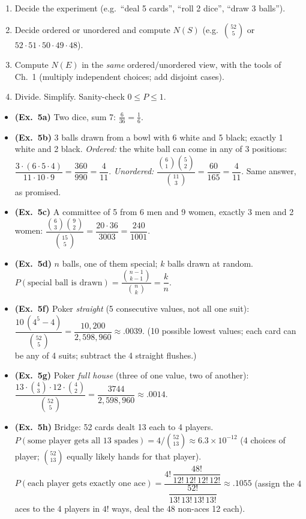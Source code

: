 \documentclass[11pt]{article}
\begin{document}
\begin{methodbox}
\begin{enumerate}
\item Decide the experiment (e.g.\ ``deal 5 cards'', ``roll 2 dice'', ``draw 3 balls'').
\item Decide ordered or unordered and compute $N(S)$ (e.g.\ $\binom{52}5$ or $52\cdot51\cdot50\cdot49\cdot48$).
\item Compute $N(E)$ in the \emph{same} ordered/unordered view, with the tools of Ch.~1 (multiply independent choices; add disjoint cases).
\item Divide. Simplify. Sanity-check $0\le P\le1$.
\end{enumerate}
\end{methodbox}

\begin{exbox}
\begin{itemize}
\item \textbf{(Ex.\ 5a)} Two dice, sum 7: $\tfrac6{36}=\tfrac16$.
\item \textbf{(Ex.\ 5b)} 3 balls drawn from a bowl with 6 white and 5 black; exactly 1 white and 2 black. \emph{Ordered:} the white ball can come in any of 3 positions: $\dfrac{3\cdot(6\cdot5\cdot4)}{11\cdot10\cdot9}=\dfrac{360}{990}=\dfrac4{11}$. \emph{Unordered:} $\dfrac{\binom61\binom52}{\binom{11}3}=\dfrac{60}{165}=\dfrac4{11}$. Same answer, as promised.
\item \textbf{(Ex.\ 5c)} A committee of 5 from 6 men and 9 women, exactly 3 men and 2 women: $\dfrac{\binom63\binom92}{\binom{15}5}=\dfrac{20\cdot36}{3003}=\dfrac{240}{1001}$.
\item \textbf{(Ex.\ 5d)} $n$ balls, one of them special; $k$ balls drawn at random. $P(\text{special ball is drawn})=\dfrac{\binom{n-1}{k-1}}{\binom nk}=\dfrac kn$.
\item \textbf{(Ex.\ 5f)} Poker \emph{straight} (5 consecutive values, not all one suit): $\dfrac{10\,(4^5-4)}{\binom{52}5}=\dfrac{10{,}200}{2{,}598{,}960}\approx.0039$. (10 possible lowest values; each card can be any of 4 suits; subtract the 4 straight flushes.)
\item \textbf{(Ex.\ 5g)} Poker \emph{full house} (three of one value, two of another): $\dfrac{13\cdot\binom43\cdot12\cdot\binom42}{\binom{52}5}=\dfrac{3744}{2{,}598{,}960}\approx.0014$.
\item \textbf{(Ex.\ 5h)} Bridge: 52 cards dealt 13 each to 4 players. $P(\text{some player gets all 13 spades})=4\big/\binom{52}{13}\approx6.3\times10^{-12}$ (4 choices of player; $\binom{52}{13}$ equally likely hands for that player). $P(\text{each player gets exactly one ace})=\dfrac{4!\,\dfrac{48!}{12!\,12!\,12!\,12!}}{\dfrac{52!}{13!\,13!\,13!\,13!}}\approx.1055$ (assign the 4 aces to the 4 players in $4!$ ways, deal the 48 non-aces 12 each).

\end{itemize}
\end{exbox}
\end{document}
